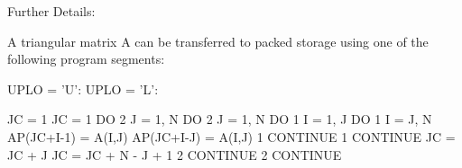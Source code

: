 \begin{DoxyParagraph}{Further Details\+: }
\begin{DoxyVerb}  A triangular matrix A can be transferred to packed storage using one
  of the following program segments:

  UPLO = 'U':                      UPLO = 'L':

        JC = 1                           JC = 1
        DO 2 J = 1, N                    DO 2 J = 1, N
           DO 1 I = 1, J                    DO 1 I = J, N
              AP(JC+I-1) = A(I,J)              AP(JC+I-J) = A(I,J)
      1    CONTINUE                    1    CONTINUE
           JC = JC + J                      JC = JC + N - J + 1
      2 CONTINUE                       2 CONTINUE\end{DoxyVerb}
 
\end{DoxyParagraph}
